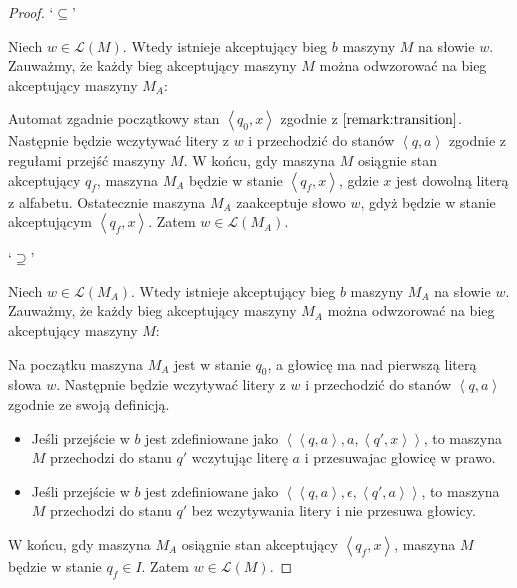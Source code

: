 \documentclass{article}
\theoremstyle{definition}
\theoremstyle{remark}
\begin{document}
\begin{proof}
`\(\subseteq\)'

Niech \(w \in \mathcal{L}(M)\). Wtedy istnieje akceptujący bieg \(b\) maszyny \(M\) na słowie \(w\).
Zauważmy, że każdy bieg akceptujący maszyny \(M\) można odwzorować na bieg akceptujący maszyny \(M_A\):

Automat zgadnie początkowy stan \(\left<q_0,x \right>\) zgodnie z \(\ref{remark:transition}\).
Następnie będzie wczytywać litery z \(w\) i przechodzić do stanów \(\left<q,a\right>\) zgodnie z regułami przejść maszyny \(M\). W końcu, gdy maszyna \(M\) osiągnie stan akceptujący \(q_f\), maszyna \(M_A\) będzie w stanie \(\left<q_f,x\right>\), gdzie \(x\) jest dowolną literą z alfabetu. 
Ostatecznie maszyna \(M_A\) zaakceptuje słowo \(w\), gdyż będzie w stanie akceptującym \(\left<q_f,x\right>\).
Zatem \(w \in \mathcal{L}(M_A)\).

`\(\supseteq\)'

Niech \(w \in \mathcal{L}(M_A)\). Wtedy istnieje akceptujący bieg \(b\) maszyny \(M_A\) na słowie \(w\).
Zauważmy, że każdy bieg akceptujący maszyny \(M_A\) można odwzorować na bieg akceptujący maszyny \(M\):

Na początku maszyna \(M_A\) jest w stanie \(q_0\), a głowicę ma nad pierwszą literą słowa \(w\).
Następnie będzie wczytywać litery z \(w\) i przechodzić do stanów \(\left<q,a\right>\) zgodnie ze swoją definicją.
\begin{itemize}
\item Jeśli przejście w \(b\) jest zdefiniowane jako \( \left< \left<q,a\right>, a, \left<q',x\right> \right> \),
 to maszyna \(M\) przechodzi do stanu \(q'\) wczytując literę \(a\) i przesuwajac głowicę w prawo.
\item Jeśli przejście w \(b\) jest zdefiniowane jako \( \left< \left<q,a\right>, \epsilon, \left<q',a\right> \right> \),
 to maszyna \(M\) przechodzi do stanu \(q'\) bez wczytywania litery i nie przesuwa głowicy.
\end{itemize}

W końcu, gdy maszyna \(M_A\) osiągnie stan akceptujący \(\left<q_f,x\right>\), maszyna \(M\) będzie w stanie \(q_f \in I\).
Zatem \(w \in \mathcal{L}(M)\).
\end{proof}
\end{document}
